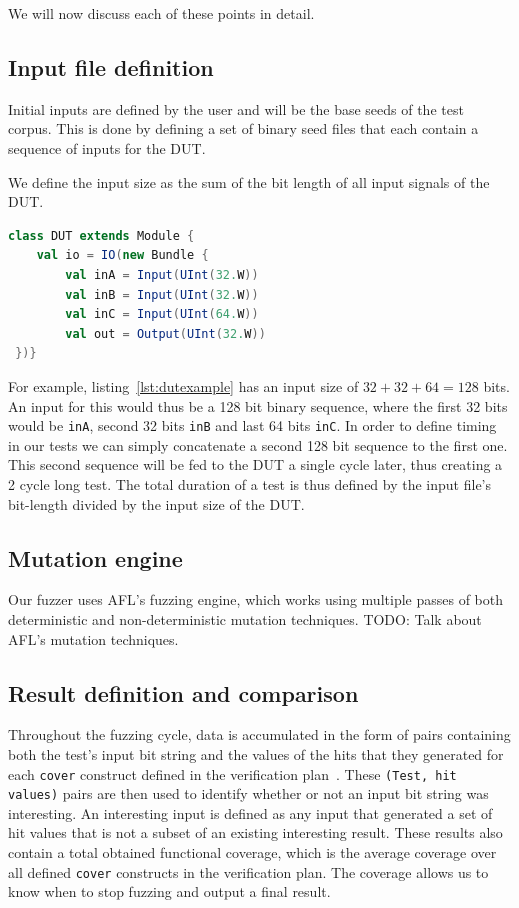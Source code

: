 \documentclass[conference]{IEEEtran}
\newcommand{\todo}[1]{{\color{olive} TODO: #1}}
\begin{document}
We will now discuss each of these points in detail.  
\subsection{Input file definition} 
Initial inputs are defined by the user and will be the base seeds of the test corpus.
This is done by defining a set of binary seed files that each contain a sequence of inputs for the DUT.

We define the input size as the sum of the bit length of all input signals of the DUT.
\begin{lstlisting}[captionpos=b,caption={Basic DUT with two 32 bit inputs, one 64 input, as well as a 32 bit output.},label={lst:dutexample},language=scala]
class DUT extends Module {
    val io = IO(new Bundle {
        val inA = Input(UInt(32.W))
        val inB = Input(UInt(32.W))
        val inC = Input(UInt(64.W))
        val out = Output(UInt(32.W))
 })}
\end{lstlisting}
For example, listing~\ref{lst:dutexample} has an input size of $32 + 32 + 64 = 128$ bits.
An input for this would thus be a 128 bit binary sequence, where the first 32 bits would be \texttt{inA}, second 32 bits \texttt{inB} and last 64 bits \texttt{inC}.
In order to define timing in our tests we can simply concatenate a second 128 bit sequence to the first one.
This second sequence will be fed to the DUT a single cycle later, thus creating a 2 cycle long test.
The total duration of a test is thus defined by the input file's bit-length divided by the input size of the DUT.

\subsection{Mutation engine}
Our fuzzer uses AFL's fuzzing engine, which works using multiple passes of both deterministic and non-deterministic mutation techniques.
\todo{Talk about AFL's mutation techniques.}

\subsection{Result definition and comparison}
Throughout the fuzzing cycle, data is accumulated in the form of pairs containing both the test's input bit string and the values of the hits that they generated for each \texttt{cover} construct defined in the verification plan~\cite{dobis2021opensource}.
These \texttt{(Test, hit values)} pairs are then used to identify whether or not an input bit string was interesting.
An interesting input is defined as any input that generated a set of hit values that is not a subset of an existing interesting result.
These results also contain a total obtained functional coverage, which is the average coverage over all defined \texttt{cover} constructs in the verification plan.
The coverage allows us to know when to stop fuzzing and output a final result.
\end{document}

